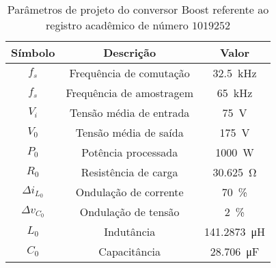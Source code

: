 \begin{table}[!ht]
\centering
\caption{Parâmetros de projeto do conversor Boost referente ao registro acadêmico de número $1019252$}
\label{tab:parametros}
\begin{tabular}{@{}ccc@{}}
\toprule
\textbf{Símbolo} & \textbf{Descrição} & \textbf{Valor}\\ \midrule
$f_s$ & Frequência de comutação & \SI{32.5}{\kilo\hertz}\\
$f_s$ & Frequência de amostragem & \SI{65}{\kilo\hertz}\\
$V_i$ & Tensão média de entrada  & \SI{75}{\V}\\
$V_0$ & Tensão média de saída  & \SI{175}{\V} \\
$P_0$ & Potência processada  & \SI{1000}{\W} \\
$R_0$ & Resistência de carga & \SI{30.625}{\ohm} \\
$\Delta{i_{L_0}}$  & Ondulação de corrente & \SI{70}{\%}\\
$\Delta{v_{C_0}}$  & Ondulação de tensão & \SI{2}{\%}\\
$L_0$ & Indutância & \SI{141.2873}{\micro\henry}\\
$C_0$ & Capacitância & \SI{28.706}{\micro\farad}\\
\bottomrule
\end{tabular}
\end{table}

